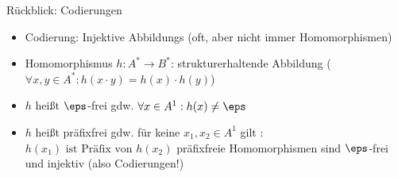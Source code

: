  \framePrevEpisode
{}
%		


\begin{frame}{Rückblick: Codierungen}
	\begin{itemize}[<+->]
		\item Codierung: Injektive Abbildungs (oft, aber nicht immer Homomorphismen)
		\item Homomorphismus $h:A^*\rightarrow B^*$: strukturerhaltende Abbildung ($\forall x,y\in A^*:h(x\cdot y) = h(x)\cdot h(y)$)
		\item $h$ heißt $\eps$-frei gdw. $\forall x\in A^1:h(x)\not = \eps$
		\item $h$ heißt präfixfrei gdw. für keine $x_1,x_2\in A^1$ gilt :$ h(x_1) \text{ ist Präfix von } h(x_2)$
		\implitem präfixfreie Homomorphismen sind $\eps$-frei und injektiv (also Codierungen!)
	\end{itemize}
\end{frame}

